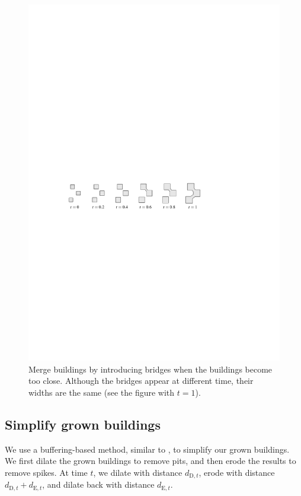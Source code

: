 \documentclass[graybox]{svmult}
\newcommand{\dtrm}[1]{d_{\mathrm{#1},t}}
\begin{document}
\begin{figure}[tb]
	\centering
	\includegraphics[draft=false]{GrowAndBridge}
	\caption{Merge buildings by introducing bridges when the buildings become 
	too close.
		Although the bridges appear at different time, 
		their widths are the same (see the figure with $t=1$).}
	\label{fig:GrowAndBridge}
\end{figure}


\subsection{Simplify grown buildings}
\label{sec:Simplify}
We use a buffering-based method, 
similar to \textcite{Damen2008,Meijers2016}, 
to simplify our grown buildings. 
We first dilate the grown buildings to remove 
pits, and then erode the results to remove spikes.
At time $t$, we dilate with distance $\dtrm{D}$, 
erode with distance $\dtrm{D}+\dtrm{E}$,
and dilate back with distance $\dtrm{E}$.
\end{document}
